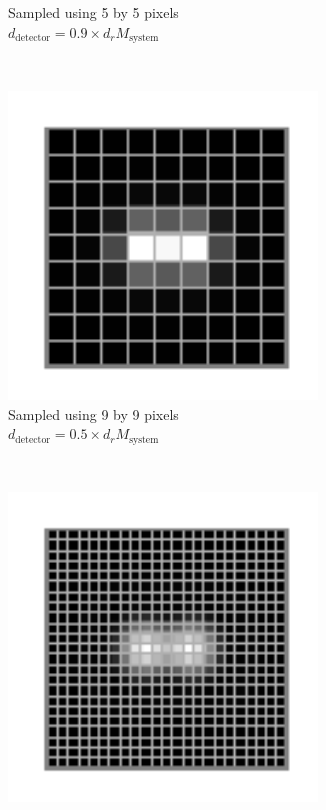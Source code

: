 \begin{figure}
\begin{subfigure}[t]{0.4\textwidth}
        \caption{Sampled using 5 by 5 pixels\\\(d_{\text{detector}} = 0.9 \times  d_{r}M_{\text{system}}\)}
        \label{fig:digital_airy_sample_5}
    \end{subfigure}
    \\
    \begin{subfigure}[t]{0.4\textwidth}
        \centering
        \includegraphics[width=0.9\textwidth]{./sampling/digital_airy_sample_9}
        \caption{Sampled using 9 by 9 pixels\\\(d_{\text{detector}} = 0.5 \times d_{r}M_{\text{system}}\)}
        \label{fig:digital_airy_sample_9}
    \end{subfigure}~
    \begin{subfigure}[t]{0.4\textwidth}
        \centering
        \includegraphics[width=0.9\textwidth]{./sampling/digital_airy_sample_23}

\end{subfigure}
\end{figure}
